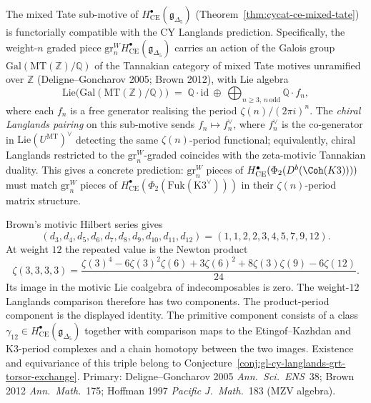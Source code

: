 \begin{remark}
\label{rem:gl-mixed-tate-zeta-periods}
The mixed Tate sub-motive of $H^\bullet_{\mathrm{CE}}
(\mathfrak{g}_{\Delta_5})$ (Theorem~\textup{\ref{thm:cycat-ce-mixed-tate}})
is functorially compatible with the CY Langlands prediction.
Specifically, the weight-$n$ graded piece
$\mathrm{gr}^W_n H^\bullet_{\mathrm{CE}}(\mathfrak{g}_{\Delta_5})$
carries an action of the Galois group
$\mathrm{Gal}(\mathrm{MT}(\mathbb{Z})/\mathbb{Q})$ of the Tannakian
category of mixed Tate motives unramified over $\mathbb{Z}$
(Deligne--Goncharov 2005; Brown 2012), with Lie algebra
\[
 \mathrm{Lie}\bigl(\mathrm{Gal}(\mathrm{MT}(\mathbb{Z})/\mathbb{Q})\bigr)
 \;=\; \mathbb{Q} \cdot \mathrm{id} \ \oplus\
 \bigoplus_{n \geq 3,\, n\,\text{odd}} \mathbb{Q} \cdot f_n,
\]
where each $f_n$ is a free generator realising the period $\zeta(n)/
(2\pi i)^n$. The \emph{chiral Langlands pairing} on this sub-motive
sends $f_n \mapsto f_n^\vee$, where $f_n^\vee$ is the
co-generator in $\mathrm{Lie}(U^{\mathrm{MT}})^\vee$ detecting the
same $\zeta(n)$-period functional; equivalently, chiral Langlands
restricted to the $\mathrm{gr}^W_n$-graded coincides with the
zeta-motivic Tannakian duality. This gives a concrete prediction:
$\mathrm{gr}^W_n$ pieces of $H^\bullet_{\mathrm{CE}}(\Phi_2(D^b(\Coh(K3))))$
must match $\mathrm{gr}^W_n$ pieces of $H^\bullet_{\mathrm{CE}}
(\Phi_2(\mathrm{Fuk}(\mathrm{K3}^\vee)))$ in their $\zeta(n)$-period
matrix structure.

Brown's motivic Hilbert series gives
\[
 (d_3,d_4,d_5,d_6,d_7,d_8,d_9,d_{10},d_{11},d_{12})
 =(1,1,2,2,3,4,5,7,9,12).
\]
At weight $12$ the repeated value is the Newton product
\[
 \zeta(3,3,3,3)
 =\frac{\zeta(3)^4-6\zeta(3)^2\zeta(6)+3\zeta(6)^2
 +8\zeta(3)\zeta(9)-6\zeta(12)}{24}.
\]
Its image in the motivic Lie coalgebra of indecomposables is zero.
The weight-$12$ Langlands comparison therefore has two components.
The product-period component is the displayed identity.  The primitive
component consists of a class
$\gamma_{12}\in H^\bullet_{\mathrm{CE}}(\mathfrak g_{\Delta_5})$
together with comparison maps to the Etingof--Kazhdan and K3-period
complexes and a chain homotopy between the two images.  Existence and
equivariance of this triple belong to
Conjecture~\textup{\ref{conj:gl-cy-langlands-grt-torsor-exchange}}.
Primary: Deligne--Goncharov 2005 \emph{Ann.\ Sci.\ ENS}~38;
Brown 2012 \emph{Ann.\ Math.}~175;
Hoffman 1997 \emph{Pacific J.\ Math.}~183 (MZV algebra).
\end{remark}

